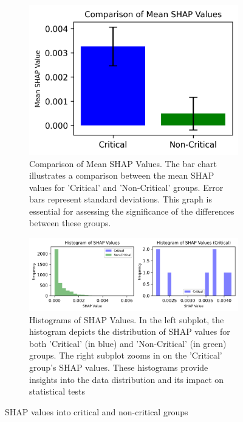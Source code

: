 \documentclass[10pt, conference, a4paper, final]{IEEEtran}
\begin{document}
    \begin{figure}[h]
        \centering
        \begin{subfigure}{.45\textwidth}
            \centering
            \includegraphics[width=\linewidth]{paper_images/bar_chart.png}
            \caption{Comparison of Mean SHAP Values. The bar chart illustrates a comparison between the mean SHAP values for 'Critical' and 'Non-Critical' groups. Error bars represent standard deviations. This graph is essential for assessing the significance of the differences between these groups.}
            \label{fig:bar_chart}
        \end{subfigure}
        \par\medskip %
        \begin{subfigure}{\columnwidth}
            \centering
            \includegraphics[width=\linewidth]{paper_images/histograms.png}
            \caption{Histograms of SHAP Values. In the left subplot, the histogram depicts the distribution of SHAP values for both 'Critical' (in blue) and 'Non-Critical' (in green) groups. The right subplot zooms in on the 'Critical' group's SHAP values. These histograms provide insights into the data distribution and its impact on statistical tests}
            \label{fig:histograms}
        \end{subfigure}
        \caption{ SHAP values into critical and non-critical groups}
    \end{figure}
\end{document}
